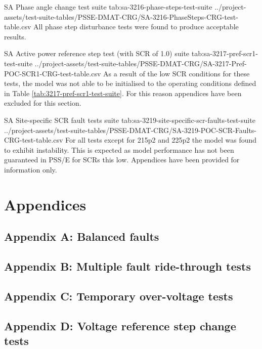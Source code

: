 \documentclass{../grid-link-report}
\newcommand{\projectassetsdir}{../project-assets}
\begin{document}
	
	{
		\fontsize{7}{9}\selectfont
		\autoscaledlongtable
		{SA Phase angle change test suite}
		{tab:sa-3216-phase-steps-test-suite}
		{\projectassetsdir/test-suite-tables/PSSE-DMAT-CRG/SA-3216-PhaseSteps-CRG-test-table.csv}
	}
	All phase step disturbance tests were found to produce acceptable results.
	
	{
		\fontsize{7}{9}\selectfont
		\autoscaledlongtable
		{SA Active power reference step test (with SCR of 1.0) suite}
		{tab:sa-3217-pref-scr1-test-suite}
		{\projectassetsdir/test-suite-tables/PSSE-DMAT-CRG/SA-3217-Pref-POC-SCR1-CRG-test-table.csv}
	}
	As a result of the low SCR conditions for these tests, the model was not able to be initialised to the operating conditions defined in Table \ref{tab:3217-pref-scr1-test-suite}. 
	For this reason appendices have been excluded for this section.
	
	
	{
		\fontsize{5}{7}\selectfont
		\autoscaledlongtable
		{SA Site-specific SCR fault tests suite}
		{tab:sa-3219-site-specific-scr-faults-test-suite}
		{\projectassetsdir/test-suite-tables/PSSE-DMAT-CRG/SA-3219-POC-SCR-Faults-CRG-test-table.csv}
	}
	For all tests except for 215p2 and 225p2 the model was found to exhibit instability. This is expected as model performance has not been guaranteed in PSS/E for SCRs this low.
	Appendices have been provided for information only.
	
	
	
	
	

	\chapter{Appendices}
	\section{Appendix A: Balanced faults}
	\label{Appendix A: Balanced faults}
	\section{Appendix B: Multiple fault ride-through tests}
	\label{Appendix B: Multiple fault ride-through tests}
	\section{Appendix C: Temporary over-voltage tests}
	\label{Appendix C: Temporary over-voltage tests}
	\section{Appendix D: Voltage reference step change tests}
	\label{Appendix D: Voltage reference step change tests}
\end{document}
